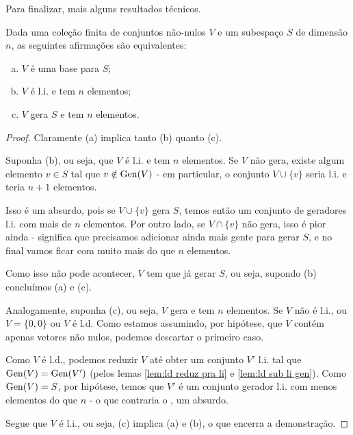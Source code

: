 Para finalizar, mais alguns resultados técnicos.

\begin{lemma}
	Dada uma coleção finita de conjuntos não-nulos $V$ e um subespaço $S$ de dimensão $n$, as seguintes afirmações são equivalentes:
	\begin{enumerate}[(a)]
		\item $V$ é uma base para $S$;
		\item $V$ é l.i. e tem $n$ elementos;
		\item $V$ gera $S$ e tem $n$ elementos.
	\end{enumerate}
\end{lemma}
\begin{proof}
	Claramente (a) implica tanto (b) quanto (c).
	
	Suponha (b), ou seja, que $V$ é l.i. e tem $n$ elementos. Se $V$ não gera, existe algum elemento $v\in S$ tal que $v\notin\operatorname{Gen}(V)$ - em particular, o conjunto $V\cup\{v\}$ seria l.i. e teria $n+1$ elementos. 
	
	Isso é um absurdo, pois se $V\cup\{v\}$ gera $S$, temos então um conjunto de geradores l.i. com mais de $n$ elementos. Por outro lado, se $V\cap\{v\}$ não gera, isso é pior ainda - significa que precisamos adicionar ainda mais gente para gerar $S$, e no final vamos ficar com muito mais do que $n$ elementos.
	
	Como isso não pode acontecer, $V$ tem que já gerar $S$, ou seja, supondo (b) concluímos (a) e (c).
	
	\bigskip
	Analogamente, suponha (c), ou seja, $V$ gera e tem $n$ elementos. Se $V$ não é l.i., ou $V=\{0,0\}$ ou $V$ é l.d. Como estamos assumindo, por hipótese, que $V$ contém apenas vetores não nulos, podemos descartar o primeiro caso.
	
	Como $V$ é l.d., podemos reduzir $V$ até obter um conjunto $V'$ l.i. tal que $\operatorname{Gen}(V)=\operatorname{Gen}(V')$ (pelos lemas \ref{lem:ld reduz pra li} e \ref{lem:ld sub li gen}). Como $\operatorname{Gen}(V)=S$, por hipótese, temos que $V'$ é um conjunto gerador l.i. com menos elementos do que $n$ - o que contraria o , um absurdo.
	
	Segue que $V$ é l.i., ou seja, (c) implica (a) e (b), o que encerra a demonstração.

\end{proof}

